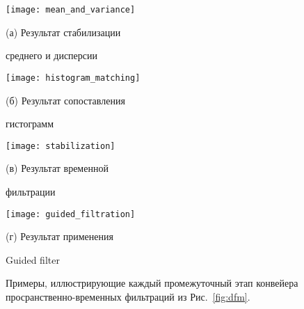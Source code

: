 \begin{figure}[!h]
	\begin{minipage}[b]{0.49\linewidth}
		\centering
		\centerline{ \texttt{[image: mean\_and\_variance]} }
		\centerline{(а) Результат стабилизации}
		\centerline{среднего и дисперсии}\medskip
	\end{minipage}%
	\hfill
	\begin{minipage}[b]{0.49\linewidth}
		\centering
		\centerline{\texttt{[image: histogram\_matching]} }
		\centerline{(б) Результат сопоставления}
		\centerline{гистограмм}\medskip
	\end{minipage}
	\hfill
	\begin{minipage}[b]{0.49\linewidth}
		\centering
		\centerline{ \texttt{[image: stabilization]} }
		\centerline{(в) Результат временной}
		\centerline{фильтрации}\medskip
	\end{minipage}%
	\hfill
	\begin{minipage}[b]{0.49\linewidth}
		\centering
		\centerline{\texttt{[image: guided\_filtration]} }
		\centerline{(г) Результат применения}
		\centerline{Guided filter}\medskip
	\end{minipage}
	\begin{minipage}[b]{\linewidth}
    \caption{ Примеры, иллюстрирующие каждый промежуточный этап конвейера
    	просранственно-временных фильтраций из Рис.~\ref{fig:dfm}.}
    \label{fig:filtered}
    \end{minipage}
\end{figure}
